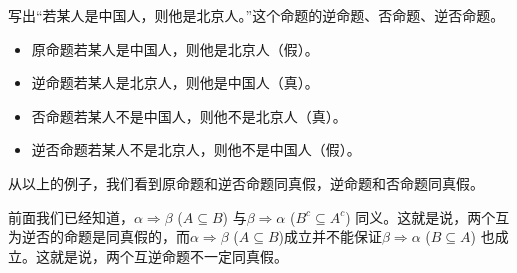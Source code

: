 \begin{example}
    写出“若某人是中国人，则他是北京人。”这个命题的逆命题、否命题、逆否命题。

\begin{itemize}
    \item 原命题\quad 若某人是中国人，则他是北京人（假）。
    \item 逆命题\quad 若某人是北京人，则他是中国人（真）。
    \item 否命题\quad 若某人不是中国人，则他不是北京人（真）。
    \item 逆否命题\quad 若某人不是北京人，则他不是中国人（假）。
\end{itemize}
\end{example}

从以上的例子，我们看到原命题和逆否命题同真假，逆命题和否命题同真假。

前面我们已经知道，$\alpha\Rightarrow \beta$ ($A\subseteq B$) 与$\beta\Rightarrow\alpha$ ($B^c\subseteq A^c$)
同义。这就是说，两个互为逆否的命题是同真假的，而$\alpha\Rightarrow\beta$ ($A\subseteq B$)成立并不能保证$\beta\Rightarrow \alpha$ ($B\subseteq A$)
也成立。这就是说，两个互逆命题不一定同真假。

